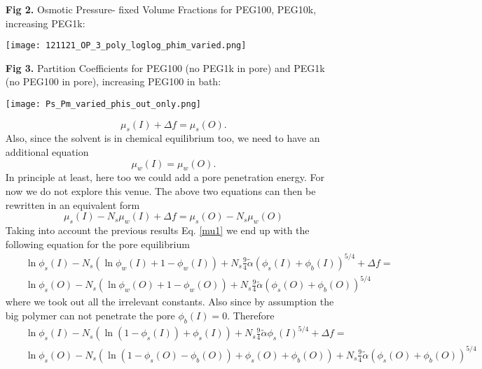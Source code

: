 \documentclass[12pt]{article}
\begin{document}
\begin{itemize}
        \item[\bf{Fig 2.}] Osmotic Pressure- fixed Volume Fractions for PEG100, PEG10k, increasing PEG1k:\\
		\centerline{\texttt{[image: 121121\_OP\_3\_poly\_loglog\_phim\_varied.png]}}
		

        \item[\bf{Fig 3.}] Partition Coefficients for PEG100 (no PEG1k in pore) and PEG1k (no PEG100 in pore), increasing PEG100 in bath:\\
		\centerline{\texttt{[image: Ps\_Pm\_varied\_phis\_out\_only.png]}}

\begin{equation}
\mu_s (I) + \Delta f = \mu_s(O).
\label{grapel1}
\end{equation}
Also, since the solvent is in chemical equilibrium too, we need to have an additional equation
\begin{equation}
\mu_w (I) = \mu_w(O).
\end{equation}
In principle at least, here too we could add a pore penetration energy. For now we do not explore this venue. The above two equations can then be rewritten in an equivalent form
\begin{equation}
\mu_{s}(I) - N_s \mu_w(I) + \Delta f = \mu_{s}(O) - N_s \mu_w(O) 
\end{equation}
Taking into account the previous results Eq. \ref{mu1} we end up with the following equation for the pore equilibrium
\begin{eqnarray}
& & \ln{\phi_{s}(I)} - N_s (\ln{\phi_w(I)} +1 - \phi_w(I)) + N_s \frac{9}{4} \tilde\alpha \left( \phi_s(I) + \phi_b(I)\right)^{5/4} + \Delta f = \nonumber\\
&& \ln{\phi_{s}(O)} - N_s (\ln{\phi_w(O)} +1 - \phi_w(O)) + N_s \frac{9}{4} \tilde\alpha \left( \phi_s(O) + \phi_b(O)\right)^{5/4}
\end{eqnarray}
where we took out all the irrelevant constants. Also since by assumption the big polymer can not penetrate the pore $ \phi_b(I) = 0$. Therefore
\begin{eqnarray}
& & \ln{\phi_{s}(I)} - N_s (\ln{(1-\phi_{s}(I))} +\phi_{s}(I)) + N_s \frac{9}{4} \tilde\alpha \phi_s(I)^{5/4} + \Delta f = \nonumber\\
&& \ln{\phi_{s}(O)} - N_s (\ln{(1 - \phi_s(O) - \phi_b(O))} + \phi_s(O) + \phi_b(O)) + N_s \frac{9}{4} \tilde\alpha \left( \phi_s(O) + \phi_b(O)\right)^{5/4}\nonumber\\

\end{eqnarray}
\end{itemize}
\end{document}

